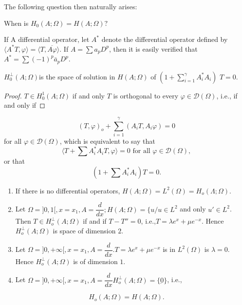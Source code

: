 The following question then naturally arises:
\begin{problem}\label{lec1:sec1:subsec3:prob1.1}%
  When is $H_0(A; \Omega)=H(A; \Omega)?$
\end{problem}

If A differential operator, let $A^*$ denote the differential operator
defined by $\langle A^* T, \varphi \rangle = \langle T, \overline {A
  \varphi} \rangle$. If $A = \sum a_p D^p$, then it is easily verified
that $A^*=\sum (-1)^p \bar{a}_p D^p$. 

\begin{proposition}\label{lec1:sec1:subsec3:prop1.2}%
  $H_0^\perp(A; \Omega)$\pageoriginale is the space of solution in $H(A; \Omega)$ of $(1+ \sum \limits ^ \gamma _{i=1} A^*_i A_i)$ $T=0$. 
\end{proposition}

\begin{proof}
  $T \in H_0^1(A; \Omega)$ if and only $T$ is orthogonal to
  every $\varphi \in \mathscr{D}(\Omega)$, i.e., if and only
  if 
\end{proof}
$$
(T, \varphi)_o + \sum ^\gamma _ {i=1}(A_i T,A_i \varphi)=0
$$
for all $\varphi \in \mathscr{D}(\Omega)$, which is equivalent
to say that  
$$
\langle T + \sum A^*_i A_i T, \varphi \rangle =0 \text{ for all }
\varphi \in \mathscr{D}(\Omega), 
$$
or that
$$
(1 + \sum A^*_i A_i)T=0.
$$


   \begin{enumerate}[1)]
   \item If there is no differential operators, $H(A ; \Omega)=L^2
     (\Omega)=H_o (\Lambda ; \Omega)$. 
   \item Let $\Omega =]0,1[,x=x_1, A= \dfrac {d}{dx}; H(A ; \Omega)= \{
    u/u \in L^2$ and only $u' \in L^2$. Then $T \in
    H ^\perp _o ( A ; \Omega)$ if and if $T-T''=0$, i.e.,$T= \lambda
    e^x+ \mu e^{-x}$. Hence $H^\perp _o (A ; \Omega)$ is space of
    dimension $2$. 
  \item Let $\Omega =]0,+ \infty [ ,x = x_1, A =
    \dfrac{d}{dx}.T=\lambda e^x + \mu e^{-x}$ is in $L^2 (\Omega)$ is
    $\lambda =0$. Hence $H^ \perp _o (A ; \Omega)$ is of dimension $1$. 
  \item Let $\Omega =] 0, + \infty [ ,x=x_1, A = \dfrac{d}{dx}H^ \perp
    _o (A ; \Omega)= \{ \underbar {0} \}$, i.e., 
   \end{enumerate}
$$
H_o (A ; \Omega)=H (A ; \Omega).
$$

